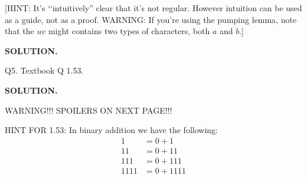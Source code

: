 [HINT: It's \lq\lq intuitively'' clear that it's
not regular.
However intuition can be used as a guide, not as a proof.
WARNING: If you're using the pumping lemma, note that 
the $uv$ might contains two types of characters, both $a$ and $b$.]

{\bf SOLUTION.}


\newpage

Q5. Textbook Q 1.53.

{\bf SOLUTION.}


\newpage


\newpage
WARNING!!! SPOILERS ON NEXT PAGE!!!

\newpage
HINT FOR 1.53:
In binary addition we have the following:
\begin{align*}
1 &= 0 + 1 \\
11 &= 0 + 11 \\
111 &= 0 + 111 \\
1111 &= 0 + 1111
\end{align*}



